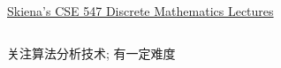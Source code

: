 \begin{frame}{}

  \begin{center}
    \href{http://www3.cs.stonybrook.edu/~algorith/math-video/}{Skiena's CSE 547 Discrete Mathematics Lectures}
  \end{center}
\end{frame}

\begin{frame}{}
  \begin{columns}
  \end{columns}

  \vspace{0.50cm}
  \begin{center}
    关注算法分析技术; 有一定难度
  \end{center}
\end{frame}
